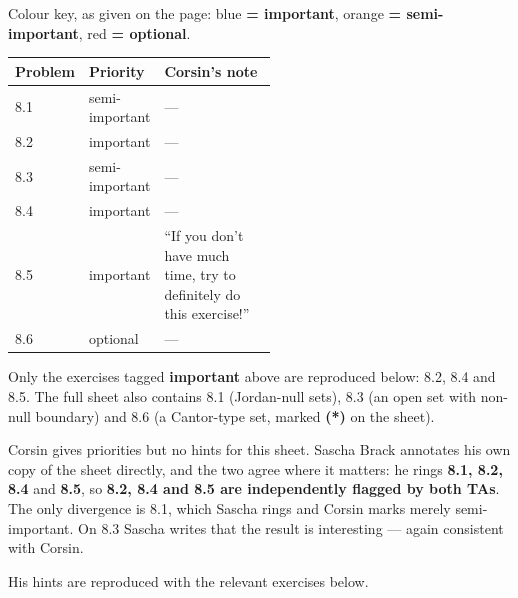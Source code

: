 \begin{ainote}
Colour key, as given on the page: blue \textbf{= important}, orange \textbf{= semi-important},
red \textbf{= optional}.

\begin{center}
\begin{tabular}{@{}l l p{0.52\linewidth}@{}}
\textbf{Problem} & \textbf{Priority} & \textbf{Corsin's note} \\
\hline
8.1 & semi-important & --- \\[3pt]
8.2 & important & --- \\[3pt]
8.3 & semi-important & --- \\[3pt]
8.4 & important & --- \\[3pt]
8.5 & important & ``If you don't have much time, try to definitely do this exercise!'' \\[3pt]
8.6 & optional & --- \\
\end{tabular}
\end{center}
\end{ainote}

\begin{ainote}
Only the exercises tagged \textbf{important} above are reproduced below: 8.2, 8.4 and 8.5. The
full sheet also contains 8.1 (Jordan-null sets), 8.3 (an open set with non-null boundary) and
8.6 (a Cantor-type set, marked \textbf{(*)}  on the sheet).
\end{ainote}

\begin{ainote}
Corsin gives priorities but no hints for this sheet. Sascha Brack annotates his own copy of the
sheet directly, and the two agree where it matters: he rings \textbf{8.1, 8.2, 8.4} and
\textbf{8.5}, so \textbf{8.2, 8.4 and 8.5 are independently flagged by both TAs}. The only
divergence is 8.1, which Sascha rings and Corsin marks merely semi-important. On 8.3 Sascha
writes that the result is interesting  --- again
consistent with Corsin.

His hints are reproduced with the relevant exercises below.
\end{ainote}

